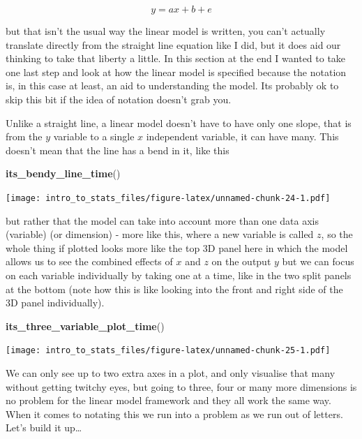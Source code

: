 \documentclass[
]{book}
\newenvironment{Shaded}{\begin{snugshade}}{\end{snugshade}}
\newcommand{\KeywordTok}[1]{\textcolor[rgb]{0.13,0.29,0.53}{\textbf{#1}}}
\newcommand{\NormalTok}[1]{#1}
\begin{document}
\begin{equation}
 y = ax + b + e
\end{equation}

but that isn't the usual way the linear model is written, you can't actually translate directly from the straight line equation like I did, but it does aid our thinking to take that liberty a little. In this section at the end I wanted to take one last step and look at how the linear model is specified because the notation is, in this case at least, an aid to understanding the model. Its probably ok to skip this bit if the idea of notation doesn't grab you.

Unlike a straight line, a linear model doesn't have to have only one slope, that is from the \(y\) variable to a single \(x\) independent variable, it can have many. This doesn't mean that the line has a bend in it, like this

\begin{Shaded}
\begin{Highlighting}[]
\KeywordTok{its_bendy_line_time}\NormalTok{()}
\end{Highlighting}
\end{Shaded}

\texttt{[image: intro\_to\_stats\_files/figure-latex/unnamed-chunk-24-1.pdf]}

but rather that the model can take into account more than one data axis (variable) (or dimension) - more like this, where a new variable is called \(z\), so the whole thing if plotted looks more like the top 3D panel here in which the model allows us to see the combined effects of \(x\) and \(z\) on the output \(y\) but we can focus on each variable individually by taking one at a time, like in the two split panels at the bottom (note how this is like looking into the front and right side of the 3D panel individually).

\begin{Shaded}
\begin{Highlighting}[]
\KeywordTok{its_three_variable_plot_time}\NormalTok{()}
\end{Highlighting}
\end{Shaded}

\texttt{[image: intro\_to\_stats\_files/figure-latex/unnamed-chunk-25-1.pdf]}

We can only see up to two extra axes in a plot, and only visualise that many without getting twitchy eyes, but going to three, four or many more dimensions is no problem for the linear model framework and they all work the same way. When it comes to notating this we run into a problem as we run out of letters. Let's build it up\ldots{}
\end{document}
